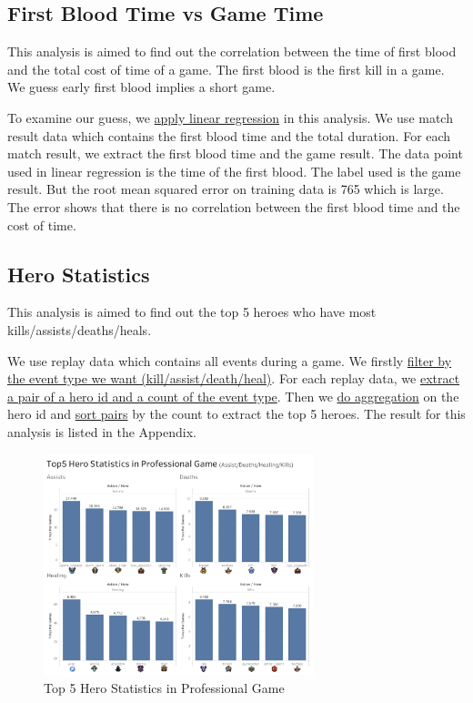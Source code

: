 \documentclass{article}
\begin{document}
\subsection{First Blood Time vs Game Time}

This analysis is aimed to find out the correlation between the time of first blood and the total cost of time of a game. The first blood is the first kill in a game. We guess early first blood implies a short game.

To examine our guess, we \href{https://github.com/Vopaaz/big-data-psg-lgd/blob/master/src/main/scala/FirstBloodTrain.scala#L31-L33}{apply linear regression} in this analysis. We use match result data which contains the first blood time and the total duration. For each match result, we extract the first blood time and the game result. The data point used in linear regression is the time of the first blood. The label used is the game result. But the root mean squared error on training data is 765 which is large. The error shows that there is no correlation between the first blood time and the cost of time.

\subsection{Hero Statistics}

This analysis is aimed to find out the top 5 heroes who have most kills/assists/deaths/heals.

We use replay data which contains all events during a game. We firstly \href{https://github.com/Vopaaz/big-data-psg-lgd/blob/master/src/main/scala/HeroMostStats.scala#L60}{filter by the event type we want (kill/assist/death/heal)}. For each replay data, we \href{https://github.com/Vopaaz/big-data-psg-lgd/blob/master/src/main/scala/HeroMostStats.scala#L61}{extract a pair of a hero id and a count of the event type}. Then we \href{https://github.com/Vopaaz/big-data-psg-lgd/blob/master/src/main/scala/HeroMostStats.scala#L62}{do aggregation} on the hero id and \href{https://github.com/Vopaaz/big-data-psg-lgd/blob/master/src/main/scala/HeroMostStats.scala#L65}{sort pairs} by the count to extract the top 5 heroes. The result for this analysis is listed in the Appendix.

\begin{figure}[H]
\centering
\includegraphics[width=0.7\textwidth]{pic/ProStat.png}
\caption{Top 5 Hero Statistics in Professional Game}
\label{Top 5 Hero Statistics in Professional Game}
\end{figure}
\end{document}
